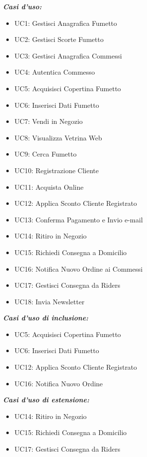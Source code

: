 \documentclass[12pt, a4paper]{article}
\begin{document}
\textbf{\textit{Casi d’uso:}}
\begin{itemize}
  \item UC1: Gestisci Anagrafica Fumetto
  \item UC2: Gestisci Scorte Fumetto
  \item UC3: Gestisci Anagrafica Commessi
  \item UC4: Autentica Commesso
  \item UC5: Acquisisci Copertina Fumetto
  \item UC6: Inserisci Dati Fumetto
  \item UC7: Vendi in Negozio
  \item UC8: Visualizza Vetrina Web
  \item UC9: Cerca Fumetto
  \item UC10: Registrazione Cliente
  \item UC11: Acquista Online
  \item UC12: Applica Sconto Cliente Registrato
  \item UC13: Conferma Pagamento e Invio e-mail
  \item UC14: Ritiro in Negozio
  \item UC15: Richiedi Consegna a Domicilio
  \item UC16: Notifica Nuovo Ordine ai Commessi
  \item UC17: Gestisci Consegna da Riders
  \item UC18: Invia Newsletter
\end{itemize}
\begin{multicols}{2}
  \textbf{\textit{Casi d’uso di inclusione:}}
  \begin{itemize}
    \item UC5: Acquisisci Copertina Fumetto
    \item UC6: Inserisci Dati Fumetto
    \item UC12: Applica Sconto Cliente Registrato
    \item UC16: Notifica Nuovo Ordine
  \end{itemize}

  \textbf{\textit{Casi d’uso di estensione:}}
  \begin{itemize}
    \item UC14: Ritiro in Negozio      
    \item UC15: Richiedi Consegna a Domicilio       
    \item UC17: Gestisci Consegna da Riders     
  \end{itemize}
\end{multicols}
\end{document}
